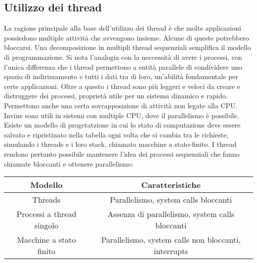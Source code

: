 \subsection{Utilizzo dei thread}
La ragione principale alla base dell'utilizzo dei thread \`e che molte applicazioni possiedono multiple attivit\`a che avvengono insieme. Alcune di queste potrebbero bloccarsi. Una
decomposizione in multipli thread sequenziali semplifica il modello di programmazione. Si nota l'analogia con la neccessit\`a di avere i processi, con l'unica differenza che i thread
permettono a entit\`a parallele di condividere uno spazio di indirizzamento e tutti i dati tra di loro, un'abilit\`a fondamentale per certe applicazioni. Oltre a questo i thread sono
pi\`u leggeri e veloci da creare e distruggere dei processi, propriet\`a utile per un sistema dinamico e rapido. Permettono anche una certa sovrapposizione di attivit\`a non legate alla
CPU. Invine sono utili in sistemi con multiple CPU, dove il parallelismo \`e possibile. Esiste un modello di progetatzione in cui lo stato di computazione deve essere salvato e 
ripristinato nella tabella ogni volta che si cambia tra le richieste, simulando i threads e i loro stack, chiamato macchine a stato-finito. I thread rendono pertanto possibile mantenere
l'idea dei processi sequenziali che fanno chiamate bloccanti e ottenere parallelismo:\\
\begin{tabular}{|c|c|}
		\hline
		\textbf{Modello} & \textbf{Caratteristiche}\\
		\hline
		Threads & Parallelismo, system calls bloccanti\\
		\hline
		Processi a thread singolo & Assenza di parallelismo, system calls bloccanti\\
		\hline
		Macchine a stato finito & Parallelismo, system calls non bloccanti, interrupts\\
		\hline
\end{tabular}
